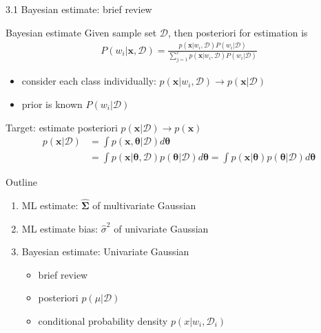 \documentclass[compress,blue]{beamer}
\newcommand{\bx}{\mathbf{x}}
\newcommand{\bSig}{\mathbf{\Sigma}}
\newcommand{\calD}{\mathcal{D}}
\begin{document}
\begin{frame}{3.1 Bayesian estimate: brief review}
	\begin{block}{Bayesian estimate}
		Given sample set $\calD$, then posteriori for estimation is
		\begin{align}
			P(w_i | \bx, \calD) = \frac{p(\bx|w_i, \calD)P(w_i | \calD)}{\sum_{j=1}^c p(\bx | w_i, \calD)P(w_i | \calD)}
		\end{align}
		\vspace{-0.15in}
		\small
		\begin{itemize}
			\item consider each class individually: $p(\bx | w_i, \calD) \rightarrow p(\bx | \calD)$
			\item prior is known $P(w_i | \calD)$ 
		\end{itemize}
		Target: estimate posteriori $p(\bx | \calD) \rightarrow p(\bx)$
		\begin{align}
			p(\bx|\calD) &= \int p(\bx, \mathbf{\theta}|\calD) d\mathbf{\theta} \\
			 &= \int p(\bx | \mathbf{\theta}, \calD) p(\mathbf{\theta} | \calD) d\mathbf{\theta} 
			 = \int p(\bx | \mathbf{\theta}) p(\mathbf{\theta} | \calD) d\mathbf{\theta}
		\end{align}	
		\normalsize
	\end{block}	
\end{frame}

\begin{frame}{Outline}
	\begin{enumerate}
		\item<1-> ML estimate: $\hat{\bSig}$ of multivariate Gaussian 
		\vspace{0.1in}
		\item<1-> ML estimate bias: $\hat{\sigma}^2$ of univariate Gaussian
		\vspace{0.1in}
		\item<1-> Bayesian estimate: Univariate Gaussian
		\begin{itemize}
			\item<1-> brief review
			\item<2-> posteriori $p(\mu|\calD)$
			\item<0> conditional probability density $p(x | w_i, \calD_i)$
		\end{itemize}
	\end{enumerate}
\end{frame}
\end{document}

